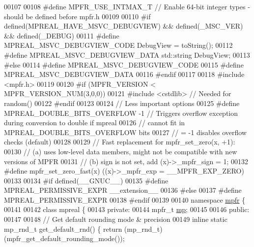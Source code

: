 \begin{DoxyCode}
00107 
00108 \textcolor{preprocessor}{#define MPFR\_USE\_INTMAX\_T   // Enable 64-bit integer types - should be defined before mpfr.h}
00109 
00110 \textcolor{preprocessor}{#if defined(MPREAL\_HAVE\_MSVC\_DEBUGVIEW) && defined(\_MSC\_VER) && defined(\_DEBUG)}
00111 \textcolor{preprocessor}{    #define MPREAL\_MSVC\_DEBUGVIEW\_CODE     DebugView = toString();}
00112 \textcolor{preprocessor}{    #define MPREAL\_MSVC\_DEBUGVIEW\_DATA     std::string DebugView;}
00113 \textcolor{preprocessor}{#else}
00114 \textcolor{preprocessor}{    #define MPREAL\_MSVC\_DEBUGVIEW\_CODE}
00115 \textcolor{preprocessor}{    #define MPREAL\_MSVC\_DEBUGVIEW\_DATA}
00116 \textcolor{preprocessor}{#endif}
00117 
00118 \textcolor{preprocessor}{#include <mpfr.h>}
00119 
00120 \textcolor{preprocessor}{#if (MPFR\_VERSION < MPFR\_VERSION\_NUM(3,0,0))}
00121 \textcolor{preprocessor}{    #include <cstdlib>}                          \textcolor{comment}{// Needed for random()}
00122 \textcolor{preprocessor}{#endif}
00123 
00124 \textcolor{comment}{// Less important options}
00125 \textcolor{preprocessor}{#define MPREAL\_DOUBLE\_BITS\_OVERFLOW -1          // Triggers overflow exception during conversion to double
       if mpreal}
00126                                                 \textcolor{comment}{// cannot fit in MPREAL\_DOUBLE\_BITS\_OVERFLOW bits}
00127                                                 \textcolor{comment}{// = -1 disables overflow checks (default)}
00128 
00129 \textcolor{comment}{// Fast replacement for mpfr\_set\_zero(x, +1):}
00130 \textcolor{comment}{// (a) uses low-level data members, might not be compatible with new versions of MPFR}
00131 \textcolor{comment}{// (b) sign is not set, add (x)->\_mpfr\_sign = 1;}
00132 \textcolor{preprocessor}{#define mpfr\_set\_zero\_fast(x)  ((x)->\_mpfr\_exp = \_\_MPFR\_EXP\_ZERO)}
00133 
00134 \textcolor{preprocessor}{#if defined(\_\_GNUC\_\_)}
00135 \textcolor{preprocessor}{  #define MPREAL\_PERMISSIVE\_EXPR \_\_extension\_\_}
00136 \textcolor{preprocessor}{#else}
00137 \textcolor{preprocessor}{  #define MPREAL\_PERMISSIVE\_EXPR}
00138 \textcolor{preprocessor}{#endif}
00139 
00140 \textcolor{keyword}{namespace }\hyperlink{namespacempfr}{mpfr} \{
00141 
00142 \textcolor{keyword}{class }mpreal \{
00143 \textcolor{keyword}{private}:
00144     mpfr\_t \hyperlink{namespaceboost_1_1multiprecision}{mp};
00145 
00146 \textcolor{keyword}{public}:
00147 
00148     \textcolor{comment}{// Get default rounding mode & precision}
00149     \textcolor{keyword}{inline} \textcolor{keyword}{static} mp\_rnd\_t   get\_default\_rnd()    \{    \textcolor{keywordflow}{return} (mp\_rnd\_t)(mpfr\_get\_default\_rounding\_mode());

\end{DoxyCode}
